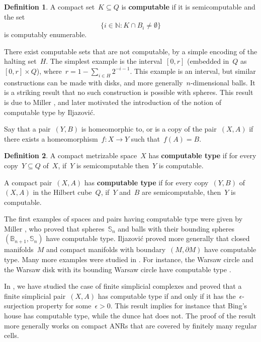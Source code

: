 \documentclass[english,11pt]{article}
\theoremstyle{plain}
\theoremstyle{remark}
\theoremstyle{definition}
\newtheorem{definition}{Definition}[section]
\newcommand{\Sp}{\mathbb{S}}
\newcommand{\BB}{\mathbb{B}}
\newcommand{\N}{\mathbb{N}}
\begin{document}
\begin{definition}
A compact set~$K\subseteq Q$ is \textbf{computable} if it is semicomputable and the set
\begin{equation*}
\{i\in\N:K\cap B_i\neq \emptyset\}
\end{equation*}
is computably enumerable.
\end{definition}

There exist computable sets that are not computable, by a simple encoding of the halting set~$H$. The simplest example is the interval~$[0,r]$ (embedded in~$Q$ as~$[0,r]\times Q$), where~$r=1-\sum_{i\in H}2^{-i-1}$. This example is an interval, but similar constructions can be made with disks,  and more generally~$n$-dimensional balls. It is a striking result that no such construction is possible with spheres. This result is due to Miller \cite{Miller02}, and later motivated the introduction of the notion of computable type by Iljazovi\'c.

Say that a pair~$(Y,B)$ is homeomorphic to, or is a copy of the pair~$(X,A)$ if there exists a homeomorphism~$f:X\to Y$ such that~$f(A)=B$.
\begin{definition}
A compact metrizable space~$X$ has \textbf{computable type} if for every copy~$Y\subseteq Q$ of~$X$, if~$Y$ is semicomputable  then~$Y$ is computable.

A compact pair~$(X,A)$ has \textbf{computable type} if for every copy~$(Y,B)$ of~$(X,A)$ in the Hilbert cube~$Q$, if~$Y$ and~$B$ are semicomputable, then~$Y$ is computable.
\end{definition}

The first examples of spaces and pairs having computable type were given by Miller \cite{Miller02}, who proved that spheres~$\Sp_n$ and balls with their bounding spheres~$(\BB_{n+1},\Sp_n)$ have computable type. Iljazovi\'c \cite{Iljazovic13} proved more generally that closed manifolds~$M$ and compact manifolds with boundary~$(M,\partial M)$ have computable type. Many more examples were studied in \cite{2009chainable_and_circularly_chainable,BurnikI14,2018manifolds,IP18,CickovicIV19,2020graphs,2020pseudocubes,CI21}. For instance, the Warsaw circle and the Warsaw disk with its bounding Warsaw circle have computable type \cite{2009chainable_and_circularly_chainable,IP18}.

In \cite{AH22}, we have studied the case of finite simplicial complexes and proved that a finite simplicial pair~$(X,A)$ has computable type if and only if it has the~$\epsilon$-surjection property for some~$\epsilon>0$. This result implies for instance that Bing's house has computable type, while the dunce hat does not. The proof of the result more generally works on compact ANRs that are covered by finitely many regular cells.
\end{document}
